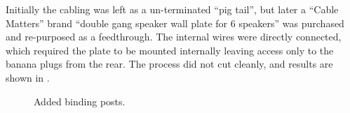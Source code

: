 \documentclass{StdTemplate} %
\begin{document}
%
Initially the cabling was left as a un-terminated “pig tail”, but later a “Cable Matters” brand “double gang speaker wall plate for 6 speakers” was purchased and re-purposed as a feedthrough. The internal wires were directly connected, which required the plate to be mounted internally leaving access only to the banana plugs from the rear. The process did not cut cleanly, and results are shown in .\par
%
\begin{figure}[h!]
\centering
{}
\qquad
{}
\caption{Added binding posts.}
\label{fig:sp_binding_posts}
\end{figure}
\end{document}
